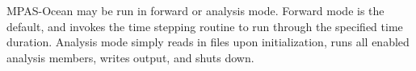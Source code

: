 MPAS-Ocean may be run in forward or analysis mode.  Forward mode is the default, and invokes the time stepping routine to run through the specified time duration.  Analysis mode simply reads in files upon initialization, runs all enabled analysis members, writes output, and shuts down.
